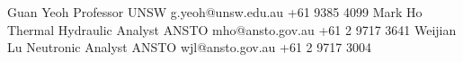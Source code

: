 %
%
%

\begin{referees}
		{Guan Yeoh}
		{Professor}
		{UNSW}
		{g.yeoh@unsw.edu.au}
		{+61 9385 4099}
		{Mark Ho}
		{Thermal Hydraulic Analyst}
		{ANSTO}
		{mho@ansto.gov.au}
		{+61 2 9717 3641}
		{\hspace{10pt}Weijian Lu}
		{\hspace{10pt}Neutronic Analyst}
		{ANSTO}
		{wjl@ansto.gov.au}
		{+61 2 9717 3004}
\end{referees}